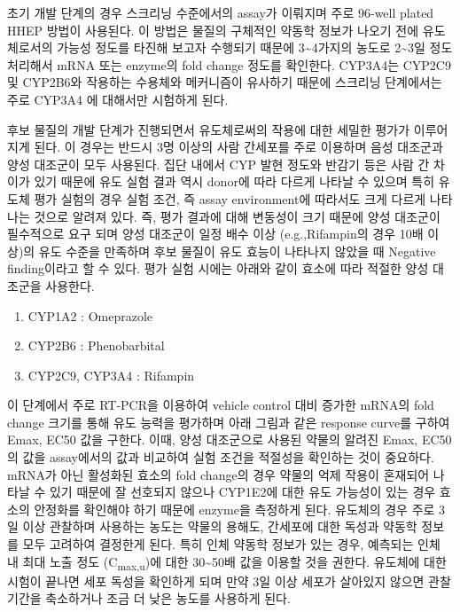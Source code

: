 \documentclass[
  11pt,
  krantz2, a4paper, twoside]{krantz}
\providecommand{\tightlist}{%
  \setlength{\itemsep}{0pt}\setlength{\parskip}{0pt}}
\begin{document}
초기 개발 단계의 경우 스크리닝 수준에서의 assay가 이뤄지며 주로 96-well
plated HHEP 방법이 사용된다. 이 방법은 물질의 구체적인 약동학 정보가
나오기 전에 유도체로서의 가능성 정도를 타진해 보고자 수행되기 때문에
3\textasciitilde4가지의 농도로 2\textasciitilde3일 정도 처리해서 mRNA 또는 enzyme의 fold change
정도를 확인한다. CYP3A4는 CYP2C9 및 CYP2B6와 작용하는 수용체와
메커니즘이 유사하기 때문에 스크리닝 단계에서는 주로 CYP3A4 에 대해서만
시험하게 된다.

후보 물질의 개발 단계가 진행되면서 유도체로써의 작용에 대한 세밀한
평가가 이루어지게 된다. 이 경우는 반드시 3명 이상의 사람 간세포를 주로
이용하며 음성 대조군과 양성 대조군이 모두 사용된다. 집단 내에서 CYP 발현
정도와 반감기 등은 사람 간 차이가 있기 때문에 유도 실험 결과 역시
donor에 따라 다르게 나타날 수 있으며 특히 유도체 평가 실험의 경우 실험
조건, 즉 assay environment에 따라서도 크게 다르게 나타나는 것으로 알려져
있다. 즉, 평가 결과에 대해 변동성이 크기 때문에 양성 대조군이 필수적으로
요구 되며 양성 대조군이 일정 배수 이상 (e.g.,Rifampin의 경우 10배
이상)의 유도 수준을 만족하며 후보 물질이 유도 효능이 나타나지 않았을 때
Negative finding이라고 할 수 있다. 평가 실험 시에는 아래와 같이 효소에
따라 적절한 양성 대조군을 사용한다.

\begin{enumerate}
\def\labelenumi{\arabic{enumi}.}
\tightlist
\item
  CYP1A2 : Omeprazole
\item
  CYP2B6 : Phenobarbital
\item
  CYP2C9, CYP3A4 : Rifampin
\end{enumerate}

이 단계에서 주로 RT-PCR을 이용하여 vehicle control 대비 증가한 mRNA의
fold change 크기를 통해 유도 능력을 평가하며 아래 그림과 같은 response
curve를 구하여 Emax, EC50 값을 구한다. 이때, 양성 대조군으로 사용된
약물의 알려진 Emax, EC50의 값을 assay에서의 값과 비교하여 실험 조건을
적절성을 확인하는 것이 중요하다. mRNA가 아닌 활성화된 효소의 fold
change의 경우 약물의 억제 작용이 혼재되어 나타날 수 있기 때문에 잘
선호되지 않으나 CYP1E2에 대한 유도 가능성이 있는 경우 효소의 안정화를
확인해야 하기 때문에 enzyme을 측정하게 된다. 유도체의 경우 주로 3일 이상
관찰하며 사용하는 농도는 약물의 용해도, 간세포에 대한 독성과 약동학
정보를 모두 고려하여 결정한게 된다. 특히 인체 약동학 정보가 있는 경우,
예측되는 인체 내 최대 노출 정도 (C\textsubscript{max,u})에 대한 30\textasciitilde50배 값을 이용할
것을 권한다. 유도체에 대한 시험이 끝나면 세포 독성을 확인하게 되며 만약
3일 이상 세포가 살아있지 않으면 관찰 기간을 축소하거나 조금 더 낮은
농도를 사용하게 된다.
\end{document}
